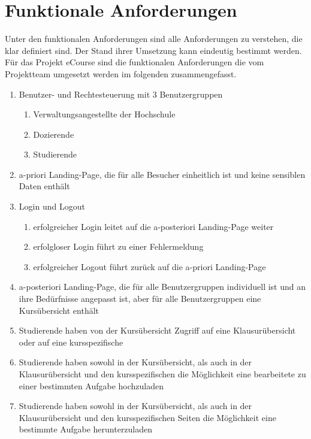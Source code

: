 
\chapter{Funktionale Anforderungen}
\label{sec:funktionale_Anforderungen}
Unter den funktionalen Anforderungen sind alle Anforderungen zu verstehen, die klar definiert sind. Der Stand ihrer Umsetzung kann eindeutig bestimmt werden. \\
Für das Projekt eCourse sind die funktionalen Anforderungen die vom Projektteam umgesetzt werden im folgenden zusammengefasst.\\
\begin{enumerate}
	\item Benutzer- und Rechtesteuerung mit 3 Benutzergruppen
	\begin{enumerate}
		\item \gls{Verwaltungsangestellte} der Hochschule
		\item \gls{Dozierende}
		\item \gls{Studierende}
	\end{enumerate}
	\item a-priori \gls{Landing-Page}, die für alle Besucher einheitlich ist und keine sensiblen Daten enthält
	\item Login und Logout
	\begin{enumerate}
		\item erfolgreicher Login leitet auf die a-posteriori \gls{Landing-Page} weiter
		\item erfolgloser Login führt zu einer Fehlermeldung
		\item erfolgreicher Logout führt zurück auf die a-priori \gls{Landing-Page}
	\end{enumerate}
	\item a-posteriori \gls{Landing-Page}, die für alle Benutzergruppen individuell ist und an ihre Bedürfnisse angepasst ist, aber für alle Benutzergruppen eine Kursübersicht enthält
	\item \gls{Studierende} haben von der Kursübersicht Zugriff auf eine Klausurübersicht oder auf eine \gls{kursspezifische}
	\item \gls{Studierende} haben sowohl in der Kursübersicht, als auch in der Klausurübersicht und den \gls{kursspezifische}n die Möglichkeit eine \gls{bearbeitete} zu einer bestimmten \gls{Aufgabe} hochzuladen
	\item \gls{Studierende} haben sowohl in der Kursübersicht, als auch in der Klausurübersicht und den \gls{kursspezifische}n Seiten die Möglichkeit eine bestimmte \gls{Aufgabe} herunterzuladen

\end{enumerate}
